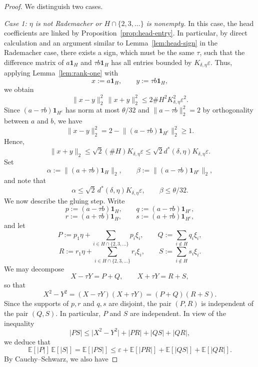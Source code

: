 \documentclass[10pt,a4paper]{amsart}
\newcommand{\E}{\mathbb E}
\newcommand{\abs}[1]{\lvert #1 \rvert}
\newcommand{\eps}{\varepsilon}
\newcommand{\norm}[1]{\lVert #1 \rVert}
\begin{document}
\begin{proof}
We distinguish two cases.
\vspace{0.5em}

\noindent\emph{Case 1: $\eta$ is not Rademacher or $H\cap\{2,3,\dots\}$ is
nonempty.}
In this case, the head coefficients are linked by
Proposition~\ref{prop:head-entry}. %
In particular, by direct calculation and an argument similar to Lemma~\ref{lem:head-sign} in the Rademacher case, 
there exists a sign, which must be the same $\tau$, such that the
difference matrix of $a\mathbf 1_H$ and $\tau b\mathbf 1_H$ has all
entries bounded by $K_{\delta,\eta}\eps$. Thus, applying Lemma~\ref{lem:rank-one} with
\[
x:=a\mathbf 1_H,
\qquad
y:=\tau b\mathbf 1_H,
\]
we obtain 
\[
\norm{x-y}_2^2\,\norm{x+y}_2^2
\le 2\#H^2 K_{\delta,\eta}^2\eps^2.
\]
Since $(a-\tau b)\mathbf{1}_{H^c}$ has norm at most $\theta/32$ and
$\norm{a-\tau b}_2^2=2$ by orthogonality between $a$ and $b$, we have
\[
\norm{x-y}_2^2
=2-\norm{(a-\tau b)\mathbf 1_{H^c}}_2^2
\ge 1.
\]
	Hence,
	\[
	\norm{x+y}_2\le \sqrt{2}(\#H) K_{\delta,\eta}\eps
	\le \sqrt{2}d^*(\delta,\eta)K_{\delta,\eta}\eps.
	\]
	Set
	\[
	\alpha:=\norm{(a+\tau b)\mathbf 1_H}_2,
	\qquad
	\beta:=\norm{(a-\tau b)\mathbf 1_{H^c}}_2,
	\]
	and note that
	\[
	\alpha\le \sqrt2\,d^*(\delta,\eta)K_{\delta,\eta}\eps,
	\qquad
	\beta\le \theta/32.
	\]
	We now describe the gluing step.  Write
	\[
	p:=(a-\tau b)\mathbf 1_H,
	\qquad
	q:=(a-\tau b)\mathbf 1_{H^c},
	\]
	\[
	r:=(a+\tau b)\mathbf 1_H,
	\qquad
	s:=(a+\tau b)\mathbf 1_{H^c},
	\]
	and let
	\[
	P:=p_1\eta+\sum_{i\in H\cap\{2,3,\dots\}} p_i\xi_i,
	\qquad
	Q:=\sum_{i\notin H} q_i\xi_i,
	\]
	\[
	R:=r_1\eta+\sum_{i\in H\cap\{2,3,\dots\}} r_i\xi_i,
	\qquad
	S:=\sum_{i\notin H} s_i\xi_i.
	\]
	We may decompose
	\[
	X-\tau Y=P+Q,
	\qquad
	X+\tau Y=R+S,
	\]
	so that
	\[
	X^2-Y^2
	=(X-\tau Y)(X+\tau Y)
	=(P+Q)(R+S).
	\]
	Since the supports of $p,r$ and $q,s$ are disjoint, the pair $(P,R)$ is
	independent of the pair $(Q,S)$. In particular, $P$ and $S$ are independent.
	In view of the inequality
	\[
	\abs{PS}\le \abs{X^2-Y^2}+\abs{PR}+\abs{QS}+\abs{QR},
	\]
	 we deduce that
	\begin{equation}
    \label{eq:aux_conc_branch}
	\E[\abs{P}]\,\E[\abs{S}]
	=\E[\abs{PS}]
	\le
	\eps+\E[\abs{PR}]+\E[\abs{QS}]+\E[\abs{QR}].
	\end{equation}
	By Cauchy--Schwarz, we also have

\end{proof}
\end{document}
